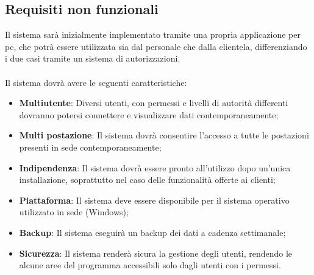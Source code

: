 \documentclass[a4paper,12pt]{article}
\begin{document}
\subsection{Requisiti non funzionali}
Il sistema sarà inizialmente implementato tramite una propria applicazione per pc, che potrà essere utilizzata sia dal personale
che dalla clientela, differenziando i due casi tramite un sistema di autorizzazioni.\\\\
Il sistema dovrà avere le seguenti caratteristiche:
\begin{itemize}
  \item{\textbf{Multiutente}}: Diversi utenti, con permessi e livelli di autorità differenti dovranno potersi connettere e visualizzare dati
    contemporaneamente;
  \item{\textbf{Multi postazione}}: Il sistema dovrà consentire l'accesso a tutte le postazioni presenti in sede contemporaneamente;
  \item{\textbf{Indipendenza}}: Il sistema dovrà essere pronto all'utilizzo dopo un'unica installazione, soprattutto nel caso delle funzionalità offerte ai clienti;
  \item{\textbf{Piattaforma}}: Il sistema deve essere disponibile per il sistema operativo utilizzato in sede (Windows);
  \item{\textbf{Backup}}: Il sistema eseguirà un backup dei dati a cadenza settimanale;
  \item{\textbf{Sicurezza}}: Il sistema renderà sicura la gestione degli utenti, rendendo le alcune aree del programma accessibili solo dagli utenti con i permessi.
\end{itemize} 
\end{document}
